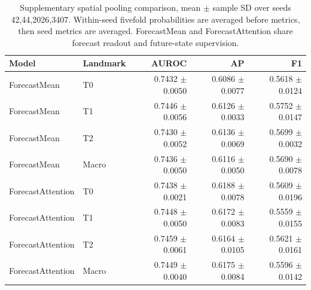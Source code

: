 \begin{table}[t]
\centering
\small
\caption{Supplementary spatial pooling comparison, mean $\pm$ sample SD over seeds 42,44,2026,3407. Within-seed fivefold probabilities are averaged before metrics, then seed metrics are averaged. ForecastMean and ForecastAttention share forecast readout and future-state supervision.}
\label{tab:pooling}
\begin{tabular}{llrrr}
\toprule
Model & Landmark & AUROC & AP & F1 \\
\midrule
ForecastMean & T0 & 0.7432 $\pm$ 0.0050 & 0.6086 $\pm$ 0.0077 & 0.5618 $\pm$ 0.0124 \\
ForecastMean & T1 & 0.7446 $\pm$ 0.0056 & 0.6126 $\pm$ 0.0033 & 0.5752 $\pm$ 0.0147 \\
ForecastMean & T2 & 0.7430 $\pm$ 0.0052 & 0.6136 $\pm$ 0.0069 & 0.5699 $\pm$ 0.0032 \\
ForecastMean & Macro & 0.7436 $\pm$ 0.0050 & 0.6116 $\pm$ 0.0050 & 0.5690 $\pm$ 0.0078 \\
ForecastAttention & T0 & 0.7438 $\pm$ 0.0021 & 0.6188 $\pm$ 0.0078 & 0.5609 $\pm$ 0.0196 \\
ForecastAttention & T1 & 0.7448 $\pm$ 0.0050 & 0.6172 $\pm$ 0.0083 & 0.5559 $\pm$ 0.0155 \\
ForecastAttention & T2 & 0.7459 $\pm$ 0.0061 & 0.6164 $\pm$ 0.0105 & 0.5621 $\pm$ 0.0161 \\
ForecastAttention & Macro & 0.7449 $\pm$ 0.0040 & 0.6175 $\pm$ 0.0084 & 0.5596 $\pm$ 0.0142 \\
\bottomrule
\end{tabular}
\end{table}
